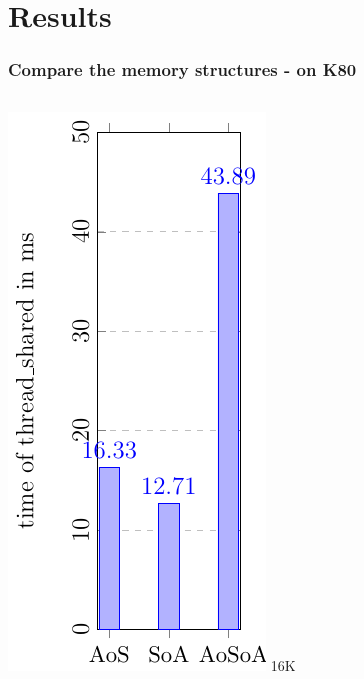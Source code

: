 \documentclass[aspectratio=169]{beamer}
\begin{document}
\section{Results} 
\begin{frame}
	\frametitle{Compare the memory structures - on K80}
	\begin{columns}
	\begin{column}{0.25\textwidth}
	\includegraphics[scale=0.55]{figures/fig1.pdf}
	\small 16K
	\end{column}
	\begin{column}{0.25\textwidth}

\end{column}
\end{columns}
\end{frame}
\end{document}
